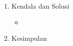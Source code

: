 \begin{enumerate}
\item Kendala dan Solusi

\begin{itemize}
\item
\end{itemize}


\item Kesimpulan

\end{enumerate}
	